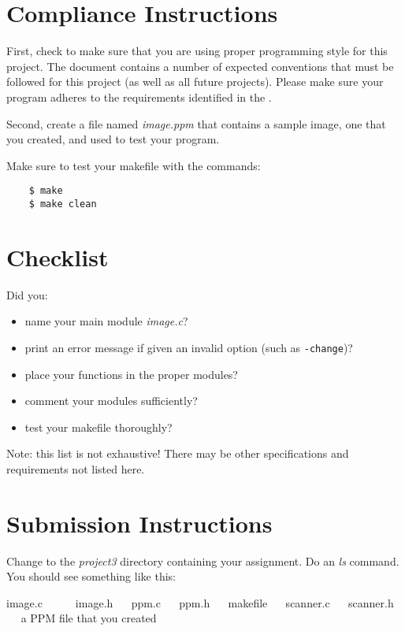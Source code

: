 \documentclass[12pt]{article}
\begin{document}
\section*{Compliance Instructions}

First, check to make sure that you are using proper programming
style for this project.  The document
 contains a number of expected
conventions that must be followed for this project (as well as all
future projects).  Please make sure your program adheres to the
requirements identified in the 
.

Second, create a file named {\it image.ppm} that contains a sample image, one
that you created, and used to test your program.

Make sure to test your makefile with the commands:

\begin{verbatim}
    $ make
    $ make clean
\end{verbatim}

\section*{Checklist}

Did you:

\begin{itemize}
\item
    name your main module {\it image.c}?
\item
    print an error message if given an invalid option (such as {\tt -change})?
\item
    place your functions in the proper modules?
\item
    comment your modules sufficiently?
\item
    test your makefile thoroughly?
\end{itemize}

Note: this list is not exhaustive! There may be other specifications
and requirements not listed here.

\section*{Submission Instructions}

Change to the {\it project3} directory containing your assignment.  Do an
{\it ls} command. You should see something like this:

{\color{red} image.c ~~ ~~ image.h ~~ ppm.c ~~ ppm.h
~~ makefile ~~ scanner.c ~~ scanner.h ~~ a PPM file that you created }
\end{document}
